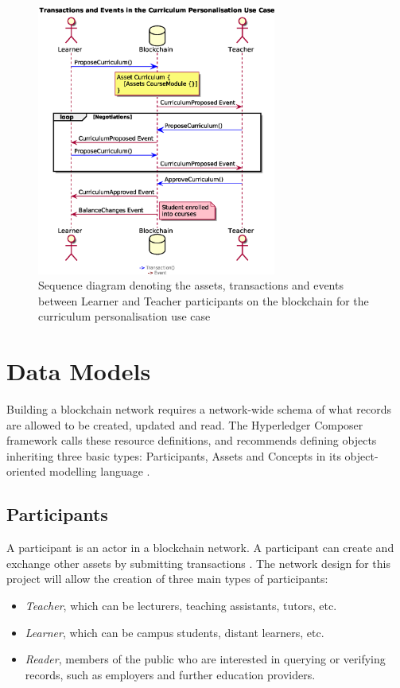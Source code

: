\begin{figure}[!ht]
	\centering
	\includegraphics[width=0.7\textwidth]{personalisationloop}
	\caption[Curriculum Personalisation Use Case]
	{Sequence diagram denoting the assets, transactions and events between
		Learner and Teacher participants on the blockchain for the curriculum personalisation use case}
	\label{fig:personalisationloop}
\end{figure}



\section{Data Models}

Building a blockchain network requires a network-wide schema of what records are allowed to be created, updated and read.
The Hyperledger Composer framework calls these resource definitions, and recommends defining objects
inheriting three basic types: Participants, Assets and Concepts in its object-oriented modelling language
\citep{official2018composer}.

\subsection{Participants}

A participant is an actor in a blockchain network. A participant can create and exchange other assets
by submitting transactions \citep{official2018composer}.
The network design for this project will allow the creation of three main types of participants:
\begin{itemize}
	\setlength\itemsep{0em}
	\item \textit{Teacher}, which can be lecturers, teaching assistants, tutors, etc.
	\item \textit{Learner}, which can be campus students, distant learners, etc.
	\item \textit{Reader}, members of the public who are interested in querying or verifying records,
	      such as employers and further education providers.
\end{itemize}

